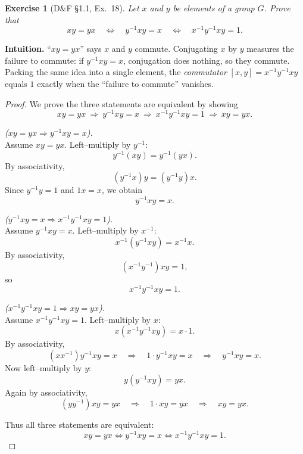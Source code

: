 \documentclass[12pt]{article}
\newtheorem{exercise}[theorem]{Exercise}
\theoremstyle{definition}
\begin{document}
\newpage

\begin{exercise}[D\&F §1.1, Ex.~18]
Let $x$ and $y$ be elements of a group $G$. Prove that
\[
xy=yx \quad\Longleftrightarrow\quad y^{-1}xy=x \quad\Longleftrightarrow\quad x^{-1}y^{-1}xy=1.
\]
\end{exercise}

\dotfill

\noindent
\textbf{Intuition.}
“$xy=yx$” says $x$ and $y$ commute. Conjugating $x$ by $y$ measures the failure to commute:
if $y^{-1}xy=x$, conjugation does nothing, so they commute. Packing the same idea into a single element,
the \emph{commutator} $[x,y]=x^{-1}y^{-1}xy$ equals $1$ exactly when the “failure to commute” vanishes.

\dotfill

\begin{proof}
We prove the three statements are equivalent by showing
\[
xy=yx \ \Rightarrow\ y^{-1}xy=x \ \Rightarrow\ x^{-1}y^{-1}xy=1 \ \Rightarrow\ xy=yx.
\]

\dotfill

\noindent\emph{($xy=yx \Rightarrow y^{-1}xy=x$).}\\

\noindent
Assume $xy=yx$. Left–multiply by $y^{-1}$:
\[
y^{-1}(xy)=y^{-1}(yx).
\]
By associativity,
\[
(y^{-1}x)y=(y^{-1}y)x.
\]
Since $y^{-1}y=1$ and $1x=x$, we obtain
\[
y^{-1}xy=x.
\]

\dotfill

\noindent\emph{($y^{-1}xy=x \Rightarrow x^{-1}y^{-1}xy=1$).}\\

\noindent
Assume $y^{-1}xy=x$. Left–multiply by $x^{-1}$:
\[
x^{-1}(y^{-1}xy)=x^{-1}x.
\]
By associativity,
\[
(x^{-1}y^{-1})xy=1,
\]
so
\[
x^{-1}y^{-1}xy=1.
\]

\dotfill

\noindent\emph{($x^{-1}y^{-1}xy=1 \Rightarrow xy=yx$).}\\

\noindent
Assume $x^{-1}y^{-1}xy=1$. Left–multiply by $x$:
\[
x(x^{-1}y^{-1}xy)=x\cdot 1.
\]
By associativity,
\[
(xx^{-1})y^{-1}xy=x
\quad\Longrightarrow\quad
1\cdot y^{-1}xy=x
\quad\Longrightarrow\quad
y^{-1}xy=x.
\]
Now left–multiply by $y$:
\[
y(y^{-1}xy)=yx.
\]
Again by associativity,
\[
(yy^{-1})xy=yx
\quad\Longrightarrow\quad
1\cdot xy=yx
\quad\Longrightarrow\quad
xy=yx.
\]

\dotfill

\noindent
Thus all three statements are equivalent:
\[
xy=yx \iff y^{-1}xy=x \iff x^{-1}y^{-1}xy=1.
\]
\end{proof}
\end{document}
